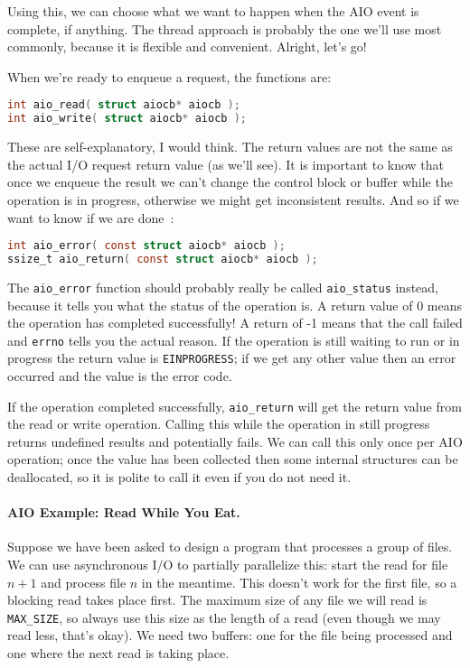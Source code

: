 Using this, we can choose what we want to happen when the AIO event is complete, if anything. The thread approach is probably the one we'll use most commonly, because it is flexible and convenient. Alright, let's go!

When we're ready to enqueue a request, the functions are:
\begin{lstlisting}[language=C]
int aio_read( struct aiocb* aiocb );
int aio_write( struct aiocb* aiocb );
\end{lstlisting}

These are self-explanatory, I would think. The return values are not the same as the actual I/O request return value (as we'll see). It is important to know that once we enqueue the result we can't change the control block or buffer while the operation is in progress, otherwise we might get inconsistent results. And so if we want to know if we are done~\cite{apunix}:

\begin{lstlisting}[language=C]
int aio_error( const struct aiocb* aiocb );
ssize_t aio_return( const struct aiocb* aiocb );
\end{lstlisting}

The \texttt{aio\_error} function should probably really be called \texttt{aio\_status} instead, because it tells you what the status of the operation is. A return value of 0 means the operation has completed successfully! A return of -1 means that the call failed and \texttt{errno} tells you the actual reason. If the operation is still waiting to run or in progress the return value is \texttt{EINPROGRESS}; if we get any other value then an error occurred and the value is the error code.

If the operation completed successfully, \texttt{aio\_return} will get the return value from the read or write operation. Calling this while the operation in still progress returns undefined results and potentially fails. We can call this only once per AIO operation; once the value has been collected then some internal structures can be deallocated, so it is polite to call it even if you do not need it.

\paragraph{AIO Example: Read While You Eat.}

Suppose we have been asked to design a program that processes a group of files. We can use asynchronous I/O to partially parallelize this: start the read for file $n+1$ and process file $n$ in the meantime. This doesn't work for the first file, so a blocking read takes place first. The maximum size of any file we will read is \texttt{MAX\_SIZE}, so always use this size as the length of a read (even though we may read less, that's okay). We need two buffers: one for the file being processed and one where the next read is taking place.

